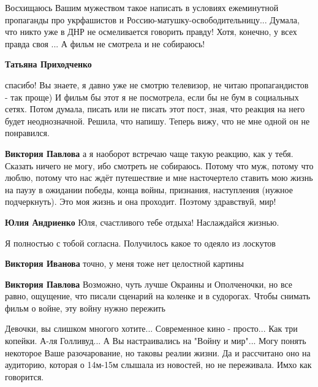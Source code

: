 \begin{itemize}
\begin{itemize}
Восхищаюсь Вашим мужеством такое написать в условиях ежеминутной пропаганды про
укрфашистов и Россию-матушку-освободительницу... Думала, что никто уже в ДНР не
осмеливается говорить правду! Хотя, конечно, у всех правда своя ... А фильм не
смотрела и не собираюсь!

\textbf{Татьяна Приходченко} 

спасибо! Вы знаете, я давно уже не смотрю телевизор, не читаю пропагандистов -
так проще) И фильм бы этот я не посмотрела, если бы не бум в социальных сетях.
Потом думала, писать или не писать этот пост, зная, что реакция на него будет
неоднозначной. Решила, что напишу. Теперь вижу, что не мне одной он не
понравился.

\textbf{Виктория Павлова} а я наоборот встречаю чаще такую реакцию, как у тебя. Сказать ничего не могу, ибо смотреть не собираюсь. Потому что муж, потому что люблю, потому что нас ждёт путешествие и мне насточертело ставить мою жизнь на паузу в ожидании победы, конца войны, признания, наступления (нужное подчеркнуть). Это моя жизнь и она проходит. Поэтому здравствуй, мир!

\textbf{Юлия Андриенко} Юля, счастливого тебе отдыха! Наслаждайся жизнью.

\end{itemize} %

Я полностью с тобой согласна. Получилось какое то одеяло из лоскутов

\begin{itemize} %
\textbf{Виктория Иванова} точно, у меня тоже нет целостной картины

\textbf{Виктория Павлова} Возможно, чуть лучше Окраины и Ополченочки, но все равно, ощущение, что писали сценарий на коленке и в судорогах.
Чтобы снимать фильм о войне, эту войну нужно пережить
\end{itemize} %


Девочки, вы слишком многого хотите... Современное кино - просто... Как три
копейки. А-ля Голливуд... А Вы настраивались на "Войну и мир"... Могу понять
некоторое Ваше разочарование, но таковы реалии жизни. Да и рассчитано оно на
аудиторию, которая о 14м-15м слышала из новостей, но не переживала. Имхо как
говорится.



\end{itemize}
